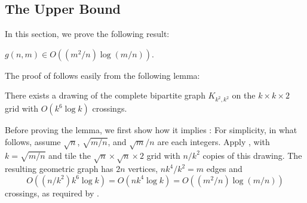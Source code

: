 \documentclass{patmorin}
\begin{document}
\subsection{The Upper Bound}

In this section, we prove the following result:

\begin{thm}
  $g(n,m) \in O((m^2/n)\log (m/n))$.
\end{thm}

The proof of  follows easily from the following lemma:
\begin{lem}
  There exists a drawing of the complete bipartite graph $K_{k^2,k^2}$
  on the $k\times k\times 2$ grid with $O(k^6\log k)$ crossings.
\end{lem}

Before proving the lemma, we first show how it implies
: For simplicity, in what follows, assume $\sqrt{n}$,
$\sqrt{m/n}$, and $\sqrt{m}/n$ are each integers.  Apply ,
with $k=\sqrt{m/n}$ and tile the $\sqrt{n}\times\sqrt{n}\times 2$ grid
with $n/k^2$ copies of this drawing. The resulting geometric graph has
$2n$ vertices, $nk^4/k^2=m$ edges and
\[ O((n/k^2)k^6\log k) = O(nk^4\log k) = O((m^2/n)\log(m/n))
\] 
crossings, as required by .
\end{document}
